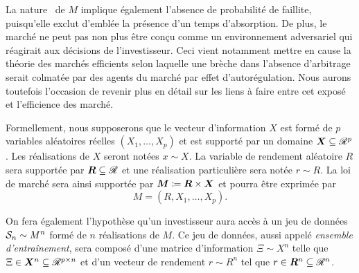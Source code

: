 La nature \iid\ de $M$ implique également l'absence de probabilité de faillite, puisqu'elle
exclut d'emblée la présence d'un temps d'absorption. De plus, le marché ne peut pas non
plus être conçu comme un environnement adversariel qui réagirait aux décisions de
l'investisseur. Ceci vient notamment mettre en cause la théorie des marchés efficients
selon laquelle une brèche dans l'absence d'arbitrage serait colmatée par des agents du
marché par effet d'autorégulation. Nous aurons toutefois l'occasion de revenir plus en
détail sur les liens à faire entre cet exposé et l'efficience des marché.

Formellement, nous supposerons que le vecteur d'information $X$ est formé de $p$ variables
aléatoires réelles $(X_1,\ldots,X_p)$ et est supporté par un domaine $\X \subseteq \Re^p$. Les
réalisations de $X$ seront notées $x \sim X$. La variable de rendement aléatoire $R$ sera
supportée par $\R \subseteq \Re$ et une réalisation particulière sera notée $r \sim R$.  La loi de
marché sera ainsi supportée par $\M \coloneq \R \times \X$ et pourra être exprimée par
\begin{equation}
  M = (R,X_1, \ldots, X_p).
\end{equation}

On fera également l'hypothèse qu'un investisseur aura accès à un jeu de données
$\S_n \sim M^n$ formé de $n$ réalisations de $M$. Ce jeu de données, aussi appelé
\textit{ensemble d'entraînement}, sera composé d'une matrice d'information $\Xi \sim X^n$ telle
que $\Xi \in \X^n \subseteq \Re^{p \times n}$ et d'un vecteur de rendement $r \sim R^n$ tel que
$r \in \R^n \subseteq \Re^n$.

